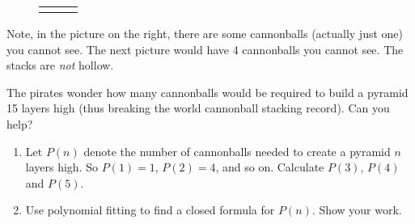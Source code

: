 \documentclass[10pt,]{book}
\theoremstyle{plain}
\theoremstyle{definition}
\numberwithin{equation}{chapter}
\newlength{\panelmax}
\begin{document}
\begin{exerciselist}
{{{{
}
}}
\newlength{\phPimage}\setlength{\phPimage}{\ht\panelboxPimage+\dp\panelboxPimage}
\settototalheight{\phPimage}{\usebox{\panelboxPimage}}
\setlength{\panelmax}{\maxof{\panelmax}{\phPimage}}
\leavevmode%
\setlength{\tabcolsep}{0.08\textwidth}
\begin{figure}
\hspace*{0.08\textwidth}%
\begin{tabular}{@{}*{3}{c}@{}}
\begin{minipage}[c][\panelmax][b]{0.08\textwidth}\usebox{\panelboxNimage}\end{minipage}&
\begin{minipage}[c][\panelmax][b]{0.18\textwidth}\usebox{\panelboxOimage}\end{minipage}&
\begin{minipage}[c][\panelmax][b]{0.26\textwidth}\usebox{\panelboxPimage}\end{minipage}\end{tabular}
\end{figure}
}%
\par

          Note, in the picture on the right, there are some cannonballs (actually just one) you cannot see. The next picture would have 4 cannonballs you cannot see. The stacks are \emph{not} hollow.
\par

          The pirates wonder how many cannonballs would be required to build a pyramid 15 layers high (thus breaking the world cannonball stacking record). Can you help?
\leavevmode%
\begin{enumerate}[label=(\alph*)]
\item\hypertarget{li-569}{}
              Let \(P(n)\) denote the number of cannonballs needed to create a pyramid \(n\) layers high. So \(P(1) = 1\), \(P(2) = 4\), and so on. Calculate \(P(3)\), \(P(4)\) and \(P(5)\).


\item\hypertarget{li-570}{}
              Use polynomial fitting to find a closed formula for \(P(n)\). Show your work.



\end{enumerate}
\end{exerciselist}
\end{document}
